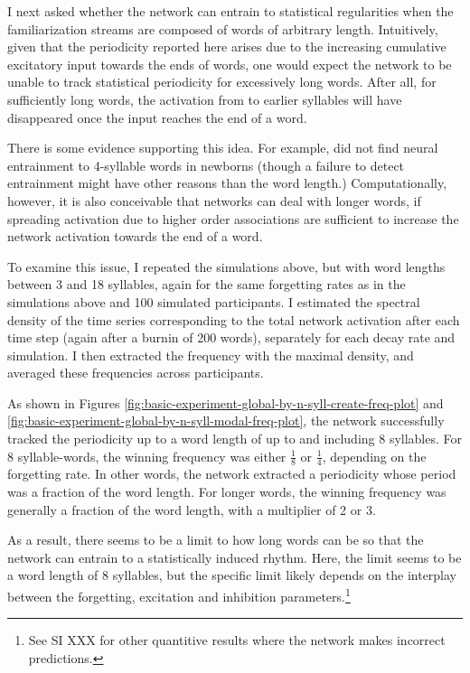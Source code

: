 \documentclass[
]{article}
\begin{document}
I next asked whether the network can entrain to statistical regularities
when the familiarization streams are composed of words of arbitrary
length. Intuitively, given that the periodicity reported here arises due
to the increasing cumulative excitatory input towards the ends of words,
one would expect the network to be unable to track statistical
periodicity for excessively long words. After all, for sufficiently long
words, the activation from to earlier syllables will have disappeared
once the input reaches the end of a word.

There is some evidence supporting this idea. For example,
\citep{Benjamin2023} did not find neural entrainment to 4-syllable words
in newborns (though a failure to detect entrainment might have other
reasons than the word length.) Computationally, however, it is also
conceivable that networks can deal with longer words, if spreading
activation due to higher order associations are sufficient to increase
the network activation towards the end of a word.

To examine this issue, I repeated the simulations above, but with word
lengths between 3 and 18 syllables, again for the same forgetting rates
as in the simulations above and 100 simulated participants. I estimated
the spectral density of the time series corresponding to the total
network activation after each time step (again after a burnin of 200
words), separately for each decay rate and simulation. I then extracted
the frequency with the maximal density, and averaged these frequencies
across participants.

As shown in Figures
\ref{fig:basic-experiment-global-by-n-syll-create-freq-plot} and
\ref{fig:basic-experiment-global-by-n-syll-modal-freq-plot}, the network
successfully tracked the periodicity up to a word length of up to and
including 8 syllables. For 8 syllable-words, the winning frequency was
either \(\frac{1}{8}\) or \(\frac{1}{4}\), depending on the forgetting
rate. In other words, the network extracted a periodicity whose period
was a fraction of the word length. For longer words, the winning
frequency was generally a fraction of the word length, with a multiplier
of 2 or 3.

As a result, there seems to be a limit to how long words can be so that
the network can entrain to a statistically induced rhythm. Here, the
limit seems to be a word length of 8 syllables, but the specific limit
likely depends on the interplay between the forgetting, excitation and
inhibition parameters.\footnote{See SI XXX for other quantitive results
  where the network makes incorrect predictions.}
\end{document}
